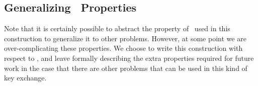 \subsection{Generalizing \zkclique~Properties}
Note that it is certainly possible to abstract the property of \zkclique~used in this construction to generalize it to other problems. However, at some point we are over-complicating these properties. We choose to write this construction with respect to \zkclique, and leave formally describing the extra properties required for future work in the case that there are other problems that can be used in this kind of key exchange.